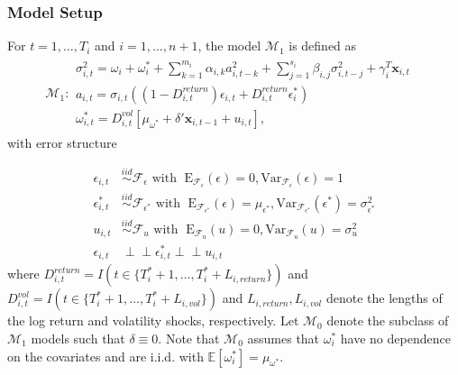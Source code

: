 \documentclass{beamer}
\newcommand{\x}{\textbf{x}}
\def\mbf#1{\mathbf{#1}} %
\newcommand{\simiid}{\stackrel{iid}{\sim}} %
\newcommand{\indep}{\perp \!\!\! \perp } %
\def\mrm#1{\mathrm{#1}} %
\def\mc#1{\mathcal{#1}} %
\def\E{\mathbb{E}} %
\def\mc#1{\mathcal{#1}}
\theoremstyle{definition}
\begin{document}
\begin{frame}
\frametitle{Model Setup}

\fontsize{6}{7.2}

For $t= 1, \ldots, T_i$ and $i = 1, \ldots, n+1$, the model $\mc{M}_1$ is defined as 
\begin{align*}
  \mc{M}_1 \colon \begin{array}{l}
     \sigma^{2}_{i,t} = \omega_{i} + \omega^{*}_i + \sum^{m_{i}}_{k=1}\alpha_{i,k}a^{2}_{i,t-k} + \sum_{j=1}^{s_{i}}\beta_{i,j}\sigma_{i,t-j}^{2} + \gamma_{i}^{T} \x_{i,t} \text{ }\\[.2cm]
     a_{i,t} = \sigma_{i,t}((1-D^{return}_{i,t})\epsilon_{i,t} + D^{return}_{i,t}\epsilon^{*}_{i})\\[.2cm]
    \omega_{i,t}^{*} = D^{vol}_{i,t}[\mu_{\omega^{*}}+\delta'\mbf{x}_{i, t-1}+ u_{i,t}],
  \end{array}
  \end{align*}
with error structure

  \begin{align*}
    \epsilon_{i,t} &\simiid \mc{F}_{\epsilon} \text{ with }  \; \mrm{E}_{\mc{F}_{\epsilon}}(\epsilon) = 0, \mrm{Var}_{\mc{F}_{\epsilon}}(\epsilon)  = 1  \\
    \epsilon^{*}_{i,t} &\simiid \mc{F}_{\epsilon^{*}} \text{ with }  \; \mrm{E}_{\mc{F}_{\epsilon^{*}}}(\epsilon) = \mu_{\epsilon^{*}}, \mrm{Var}_{\mc{F}_{\epsilon^{*}}}(\epsilon^{*})  = \sigma^2_{\epsilon^{*}}  \\
    u_{i,t} & \simiid  \mc{F}_{u} \text{ with }  \; \mrm{E}_{\mc{F}_{u}}(u) = 0, \mrm{Var}_{\mc{F}_{u}}(u) = \sigma^2_{u}\\
    \epsilon_{i,t} & \indep  \epsilon^{*}_{i,t}  \indep u_{i,t}
    \end{align*}
where $D^{return}_{i,t} = I(t \in \{T_i^* + 1,...,T_i^* + L_{i, return}\})$ and $D^{vol}_{i,t} = I(t \in \{T_i^* + 1,...,T_i^* + L_{i, vol}\})$ and $L_{i,return},L_{i,vol}$ denote the lengths of the log return and volatility shocks, respectively.  Let $\mc{M}_{0}$ denote the subclass of $\mc{M}_{1}$ models such that $\delta \equiv 0$.  Note that $\mc{M}_{0}$ assumes that $\omega^{*}_i$ have no dependence on the covariates and are i.i.d. with $\E[ \omega^{*}_i]=\mu_{\omega^{*}}$.  
\end{frame}
\end{document}
